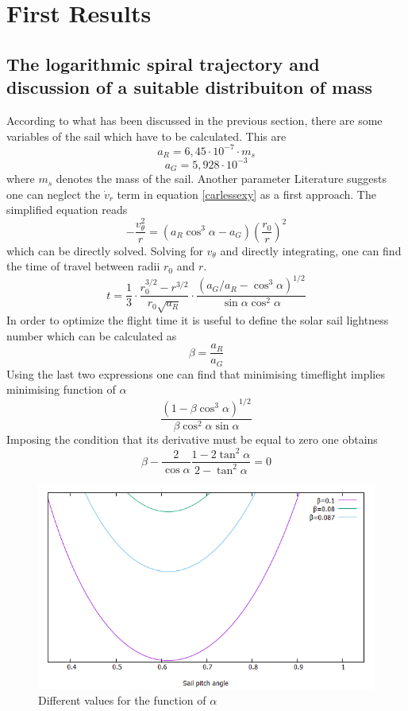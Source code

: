 \documentclass[twocolumn,12pt,a4paper]{article}
\numberwithin{equation}{section}
\begin{document}
\section{First Results}
\subsection{The logarithmic spiral trajectory and discussion of a suitable distribuiton of mass}
According to what has been discussed in the previous section, there are some variables of the sail which have to be calculated. This are
\[
a_R=6,45\cdot 10^{-7} \cdot m_s
\]
\[a_G=5,928\cdot 10^{-3}
\]
where $m_s$ denotes the mass of the sail.
Another parameter
Literature suggests \cite{tsu} one can neglect the  $\dot{v}_r$ term in equation \ref{carlessexy} as a first approach. The simplified equation reads
\begin{equation}
- \dfrac{v_{\theta}^2}{r} = (a_R \cos^3{\alpha} - a_G) \left(\dfrac{r_0}{r}\right)^2
\end{equation} 
which can be directly solved.
Solving for $v_{\theta}$ and directly integrating, one can find the time of travel between radii $r_0$ and $r$.
\begin{equation}
	t=\frac{1}{3}\cdot\frac{r_0^{3/2}-r^{3/2}}{r_0\sqrt{a_R}}\cdot\frac{(a_G/a_R-\cos^3\alpha)^{1/2}}{\sin\alpha\cos^2\alpha}
\end{equation}
In order to optimize the flight time it is useful to define the solar sail lightness number which can be calculated as
\begin{equation}
	\beta=\frac{a_R}{a_G}
\end{equation}
Using the last two expressions one can find that minimising timeflight implies minimising function of $\alpha$
\begin{equation}
	\frac{(1-\beta\cos^3\alpha)^{1/2}}{\beta\cos^2\alpha\sin\alpha}
\end{equation}
Imposing the condition that its derivative must be equal to zero one obtains
\begin{equation}
	\beta-\frac{2}{\cos\alpha}\frac{1-2\tan^2\alpha}{2-\tan^2\alpha}=0
\end{equation}
\begin{figure}[h] \label{fig:arnauoficinista}
	
	\centering
	\includegraphics[scale=0.3]{angle.png}
	\caption{\small Different values for the function of $\alpha$}
\end{figure}
\end{document}
